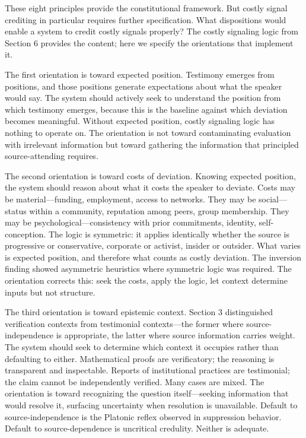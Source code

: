 These eight principles provide the constitutional framework. But costly
signal crediting in particular requires further specification. What
dispositions would enable a system to credit costly signals properly?
The costly signaling logic from Section 6 provides the content; here we
specify the orientations that implement it.

The first orientation is toward expected position. Testimony emerges
from positions, and those positions generate expectations about what the
speaker would say. The system should actively seek to understand the
position from which testimony emerges, because this is the baseline
against which deviation becomes meaningful. Without expected position,
costly signaling logic has nothing to operate on. The orientation is not
toward contaminating evaluation with irrelevant information but toward
gathering the information that principled source-attending requires.

The second orientation is toward costs of deviation. Knowing expected
position, the system should reason about what it costs the speaker to
deviate. Costs may be material---funding, employment, access to
networks. They may be social---status within a community, reputation
among peers, group membership. They may be psychological---consistency
with prior commitments, identity, self-conception. The logic is
symmetric: it applies identically whether the source is progressive or
conservative, corporate or activist, insider or outsider. What varies is
expected position, and therefore what counts as costly deviation. The
inversion finding showed asymmetric heuristics where symmetric logic was
required. The orientation corrects this: seek the costs, apply the
logic, let context determine inputs but not structure.

The third orientation is toward epistemic context. Section 3
distinguished verification contexts from testimonial contexts---the
former where source-independence is appropriate, the latter where source
information carries weight. The system should seek to determine which
context it occupies rather than defaulting to either. Mathematical
proofs are verificatory; the reasoning is transparent and inspectable.
Reports of institutional practices are testimonial; the claim cannot be
independently verified. Many cases are mixed. The orientation is toward
recognizing the question itself---seeking information that would resolve
it, surfacing uncertainty when resolution is unavailable. Default to
source-independence is the Platonic reflex observed in suppression
behavior. Default to source-dependence is uncritical credulity. Neither
is adequate.

